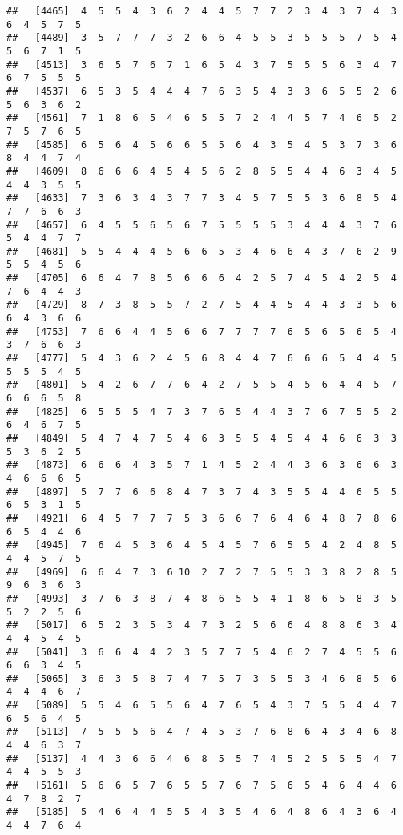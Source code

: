 \documentclass[
]{book}
\begin{document}
\begin{verbatim}
##   [4465]  4  5  5  4  3  6  2  4  4  5  7  7  2  3  4  3  7  4  3  6  4  5  7  5
##   [4489]  3  5  7  7  7  3  2  6  6  4  5  5  3  5  5  5  7  5  4  5  6  7  1  5
##   [4513]  3  6  5  7  6  7  1  6  5  4  3  7  5  5  5  6  3  4  7  6  7  5  5  5
##   [4537]  6  5  3  5  4  4  4  7  6  3  5  4  3  3  6  5  5  2  6  5  6  3  6  2
##   [4561]  7  1  8  6  5  4  6  5  5  7  2  4  4  5  7  4  6  5  2  7  5  7  6  5
##   [4585]  6  5  6  4  5  6  6  5  5  6  4  3  5  4  5  3  7  3  6  8  4  4  7  4
##   [4609]  8  6  6  6  4  5  4  5  6  2  8  5  5  4  4  6  3  4  5  4  4  3  5  5
##   [4633]  7  3  6  3  4  3  7  7  3  4  5  7  5  5  3  6  8  5  4  7  7  6  6  3
##   [4657]  6  4  5  5  6  5  6  7  5  5  5  5  3  4  4  4  3  7  6  5  4  4  7  7
##   [4681]  5  5  4  4  4  5  6  6  5  3  4  6  6  4  3  7  6  2  9  5  5  4  5  6
##   [4705]  6  6  4  7  8  5  6  6  6  4  2  5  7  4  5  4  2  5  4  7  6  4  4  3
##   [4729]  8  7  3  8  5  5  7  2  7  5  4  4  5  4  4  3  3  5  6  6  4  3  6  6
##   [4753]  7  6  6  4  4  5  6  6  7  7  7  7  6  5  6  5  6  5  4  3  7  6  6  3
##   [4777]  5  4  3  6  2  4  5  6  8  4  4  7  6  6  6  5  4  4  5  5  5  5  4  5
##   [4801]  5  4  2  6  7  7  6  4  2  7  5  5  4  5  6  4  4  5  7  6  6  6  5  8
##   [4825]  6  5  5  5  4  7  3  7  6  5  4  4  3  7  6  7  5  5  2  6  4  6  7  5
##   [4849]  5  4  7  4  7  5  4  6  3  5  5  4  5  4  4  6  6  3  3  5  3  6  2  5
##   [4873]  6  6  6  4  3  5  7  1  4  5  2  4  4  3  6  3  6  6  3  4  6  6  6  5
##   [4897]  5  7  7  6  6  8  4  7  3  7  4  3  5  5  4  4  6  5  5  6  5  3  1  5
##   [4921]  6  4  5  7  7  7  5  3  6  6  7  6  4  6  4  8  7  8  6  6  5  4  4  6
##   [4945]  7  6  4  5  3  6  4  5  4  5  7  6  5  5  4  2  4  8  5  4  4  5  7  5
##   [4969]  6  6  4  7  3  6 10  2  7  2  7  5  5  3  3  8  2  8  5  9  6  3  6  3
##   [4993]  3  7  6  3  8  7  4  8  6  5  5  4  1  8  6  5  8  3  5  5  2  2  5  6
##   [5017]  6  5  2  3  5  3  4  7  3  2  5  6  6  4  8  8  6  3  4  4  4  5  4  5
##   [5041]  3  6  6  4  4  2  3  5  7  7  5  4  6  2  7  4  5  5  6  6  6  3  4  5
##   [5065]  3  6  3  5  8  7  4  7  5  7  3  5  5  3  4  6  8  5  6  4  4  4  6  7
##   [5089]  5  5  4  6  5  5  6  4  7  6  5  4  3  7  5  5  4  4  7  6  5  6  4  5
##   [5113]  7  5  5  5  6  4  7  4  5  3  7  6  8  6  4  3  4  6  8  4  4  6  3  7
##   [5137]  4  4  3  6  6  4  6  8  5  5  7  4  5  2  5  5  5  4  7  4  4  5  5  3
##   [5161]  5  6  6  5  7  6  5  5  7  6  7  5  6  5  4  6  4  4  6  4  7  8  2  7
##   [5185]  5  4  6  4  4  5  5  4  3  5  4  6  4  8  6  4  3  6  4  4  4  7  6  4

\end{verbatim}
\end{document}

